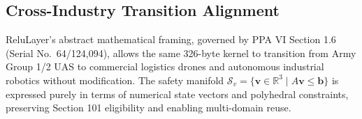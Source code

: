 \documentclass[11pt]{article}
\begin{document}
\subsection{Cross-Industry Transition Alignment}

ReluLayer's abstract mathematical framing, governed by PPA VI Section 1.6 (Serial No.~64/124,094), allows the same 326-byte kernel to transition from Army Group 1/2 UAS to commercial logistics drones and autonomous industrial robotics without modification. The safety manifold $\mathcal{S}_v = \{ \mathbf{v} \in \mathbb{R}^3 \mid A \mathbf{v} \le \mathbf{b} \}$ is expressed purely in terms of numerical state vectors and polyhedral constraints, preserving Section 101 eligibility and enabling multi-domain reuse.
\end{document}
